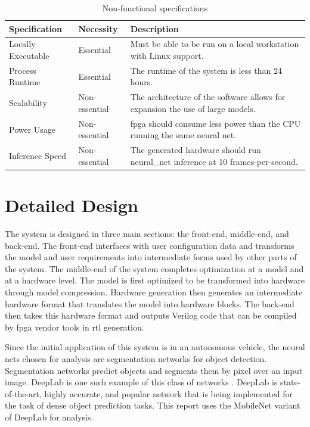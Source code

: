 \documentclass{uw-ece-wkrpt}
\begin{document}
\begin{table}[H]
\centering
\caption{Non-functional specifications}\label{tab:non-func_specs}
\begin{tabularx}{\textwidth}{llX}
\toprule
Specification & Necessity & Description \\
\midrule
Locally Executable & Essential & Must be able to be run on a local workstation with Linux support. \\
Process Runtime & Essential & The runtime of the system is less than 24 hours. \\
Scalability & Non-essential & The architecture of the software allows for expansion the use of large models. \\
Power Usage & Non-essential & \gls{fpga} should consume less power than the CPU running the same neural net. \\
Inference Speed & Non-essential & The generated hardware should run \gls{neural_net} inference at 10 frames-per-second. \\
\bottomrule
\end{tabularx}
\end{table}

\section{Detailed Design}

The system is designed in three main sections: the front-end, middle-end, and back-end. The front-end interfaces with user configuration data and transforms the model and user requirements into intermediate forms used by other parts of the system. The middle-end of the system completes optimization at a model and at a hardware level. The model is first optimized to be transformed into hardware through model compression. Hardware generation then generates an intermediate hardware format that translates the model into hardware blocks. The back-end then takes this hardware format and outputs Verilog code that can be compiled by \gls{fpga} vendor tools in \gls{rtl} generation.

Since the initial application of this system is in an autonomous vehicle, the neural nets chosen for analysis are segmentation networks for object detection. Segmentation networks predict objects and segments them by pixel over an input image. DeepLab is one such example of this class of networks \cite{Chen2018DeepLab:-Semant}. DeepLab is state-of-the-art, highly accurate, and popular network that is being implemented for the task of dense object prediction tasks. This report uses the MobileNet variant of DeepLab for analysis.
\end{document}
